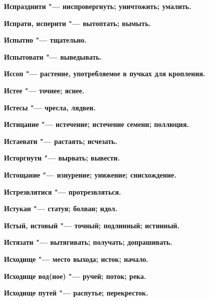 \begin{mymulticols}{2}
\bfseries Испразднити\normalfont{} "--- ниспровергнуть; уничтожить; умалить. 




\bfseries Испрати, исперити\normalfont{} "--- вытоптать; вымыть. 




\bfseries Испытно\normalfont{} "--- тщательно. 




\bfseries Испытовати\normalfont{} "--- выведывать. 




\bfseries Иссоп\normalfont{} "--- растение, употребляемое в пучках для кропления. 




\bfseries Истее\normalfont{} "--- точнее; яснее. 




\bfseries Истесы\normalfont{} "--- чресла, лядвеи. 




\bfseries Истицание\normalfont{} "--- истечение; истечение семени; поллюция. 




\bfseries Истаевати\normalfont{} "--- растаять; исчезать. 




\bfseries Исторгнути\normalfont{} "--- вырвать; вывести. 




\bfseries Истощание\normalfont{} "--- изнурение; унижение; снисхождение. 




\bfseries Истрезвлятися\normalfont{} "--- протрезвляться. 




\bfseries Истукан\normalfont{} "--- статуя; болван; идол. 




\bfseries Истый, истовый\normalfont{} "--- точный; подлинный; истинный. 




\bfseries Истязати\normalfont{} "--- вытягивать; получать; допрашивать. 




\bfseries Исходище\normalfont{} "--- место выхода; исток; начало. 




\bfseries Исходище вод(ное)\normalfont{} "--- ручей; поток; река. 




\bfseries Исходище путей\normalfont{} "--- распутье; перекресток. 





\end{mymulticols}
